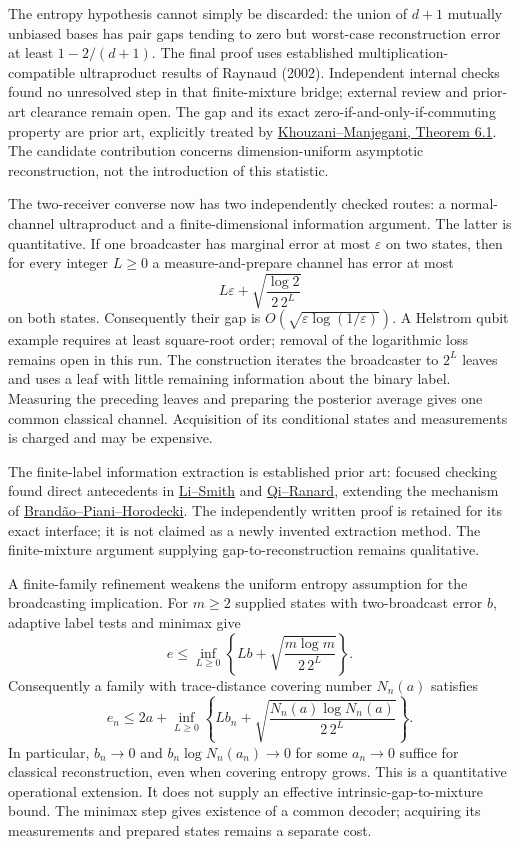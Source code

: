 \documentclass[11pt]{article}
\begin{document}
The entropy hypothesis cannot simply be discarded: the union of $d+1$ mutually unbiased bases has pair gaps tending to zero but worst-case reconstruction error at least $1-2/(d+1)$. The final proof uses established multiplication-compatible ultraproduct results of Raynaud (2002). Independent internal checks found no unresolved step in that finite-mixture bridge; external review and prior-art clearance remain open. The gap and its exact zero-if-and-only-if-commuting property are prior art, explicitly treated by \href{https://arxiv.org/pdf/2609.14203}{Khouzani--Manjegani, Theorem 6.1}. The candidate contribution concerns dimension-uniform asymptotic reconstruction, not the introduction of this statistic.

The two-receiver converse now has two independently checked routes: a normal-channel ultraproduct and a finite-dimensional information argument. The latter is quantitative. If one broadcaster has marginal error at most $\varepsilon$ on two states, then for every integer $L\ge0$ a measure-and-prepare channel has error at most
\[
 L\varepsilon+\sqrt{\frac{\log 2}{2\,2^L}}
\]
on both states. Consequently their gap is $O(\sqrt{\varepsilon\log(1/\varepsilon)})$. A Helstrom qubit example requires at least square-root order; removal of the logarithmic loss remains open in this run. The construction iterates the broadcaster to $2^L$ leaves and uses a leaf with little remaining information about the binary label. Measuring the preceding leaves and preparing the posterior average gives one common classical channel. Acquisition of its conditional states and measurements is charged and may be expensive.

The finite-label information extraction is established prior art: focused checking found direct antecedents in \href{https://arxiv.org/abs/1408.6829}{Li--Smith} and \href{https://arxiv.org/abs/2001.01507}{Qi--Ranard}, extending the mechanism of \href{https://arxiv.org/abs/1310.8640}{Brand\~ao--Piani--Horodecki}. The independently written proof is retained for its exact interface; it is not claimed as a newly invented extraction method. The finite-mixture argument supplying gap-to-reconstruction remains qualitative.

A finite-family refinement weakens the uniform entropy assumption for the broadcasting implication. For $m\ge2$ supplied states with two-broadcast error $b$, adaptive label tests and minimax give
\[
 e\le\inf_{L\ge0}\left\{Lb+\sqrt{\frac{m\log m}{2\,2^L}}\right\}.
\]
Consequently a family with trace-distance covering number $N_n(a)$ satisfies
\[
 e_n\le2a+\inf_{L\ge0}\left\{Lb_n+
            \sqrt{\frac{N_n(a)\log N_n(a)}{2\,2^L}}\right\}.
\]
In particular, $b_n\to0$ and $b_n\log N_n(a_n)\to0$ for some $a_n\to0$ suffice for classical reconstruction, even when covering entropy grows. This is a quantitative operational extension. It does not supply an effective intrinsic-gap-to-mixture bound. The minimax step gives existence of a common decoder; acquiring its measurements and prepared states remains a separate cost.
\end{document}
